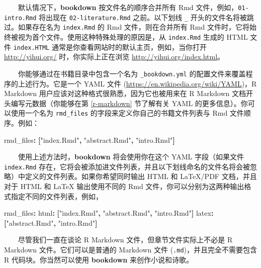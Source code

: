 \documentclass[
  12pt,
]{krantz}
\newenvironment{Shaded}{\begin{snugshade}}{\end{snugshade}}
\newcommand{\AttributeTok}[1]{\textcolor[rgb]{0.77,0.63,0.00}{#1}}
\newcommand{\FunctionTok}[1]{\textcolor[rgb]{0.00,0.00,0.00}{#1}}
\newcommand{\KeywordTok}[1]{\textcolor[rgb]{0.13,0.29,0.53}{\textbf{#1}}}
\newcommand{\StringTok}[1]{\textcolor[rgb]{0.31,0.60,0.02}{#1}}
\theoremstyle{definition}
\theoremstyle{definition}
\theoremstyle{definition}
\theoremstyle{definition}
\theoremstyle{remark}
\begin{document}
  默认情况下，\textbf{bookdown} 按文件名的顺序合并所有 Rmd 文件，例如，\texttt{01-intro.Rmd} 将出现在 \texttt{02-literature.Rmd} 之前。以下划线 \texttt{\_} 开头的文件名将被跳过。如果存在名为 \texttt{index.Rmd} 的 Rmd 文件，则在合并所有 Rmd 文件时，它将始终被视为首个文件。使用这种特殊处理的原因是，从 \texttt{index.Rmd} 生成的 HTML 文件 \texttt{index.HTML} 通常是你查看网站时的默认主页，例如，当你打开 \url{http://yihui.org/} 时，你实际上正在浏览 \url{http://yihui.org/index.html}。

  你能够通过在书籍目录中包含一个名为 \texttt{\_bookdown.yml} 的配置文件来覆盖程序的上述行为。它是一个 YAML 文件 (\url{https://en.wikipedia.org/wiki/YAML})，R Markdown 用户应该对这种格式很熟悉，因为它也被用来在 R Markdown 文档开头编写元数据（你能够在第 \ref{r-markdown} 节了解有关 YAML 的更多信息）。你可以使用一个名为 \texttt{rmd\_files} 的字段来定义你自己的书籍文件列表与 Rmd 文件顺序。例如：

\begin{Shaded}
\begin{Highlighting}[]
\FunctionTok{rmd\_files}\KeywordTok{:}\AttributeTok{ }\KeywordTok{[}\StringTok{"index.Rmd"}\KeywordTok{,}\AttributeTok{ }\StringTok{"abstract.Rmd"}\KeywordTok{,}\AttributeTok{ }\StringTok{"intro.Rmd"}\KeywordTok{]}
\end{Highlighting}
\end{Shaded}

  使用上述方法时，\textbf{bookdown} 将会使用你在这个 YAML 字段（如果文件 \texttt{index.Rmd} 存在，它将会被添加进文件列表，并且以下划线命名的文件名将会被忽略）中定义的文件列表。如果你希望同时输出 HTML 和 LaTeX/PDF 文档，并且对于 HTML 和 LaTeX 输出使用不同的 Rmd 文件，你可以分别为这两种输出格式指定不同的文件列表，例如，

\begin{Shaded}
\begin{Highlighting}[]
\FunctionTok{rmd\_files}\KeywordTok{:}
\AttributeTok{  }\FunctionTok{html}\KeywordTok{:}\AttributeTok{ }\KeywordTok{[}\StringTok{"index.Rmd"}\KeywordTok{,}\AttributeTok{ }\StringTok{"abstract.Rmd"}\KeywordTok{,}\AttributeTok{ }\StringTok{"intro.Rmd"}\KeywordTok{]}
\AttributeTok{  }\FunctionTok{latex}\KeywordTok{:}\AttributeTok{ }\KeywordTok{[}\StringTok{"abstract.Rmd"}\KeywordTok{,}\AttributeTok{ }\StringTok{"intro.Rmd"}\KeywordTok{]}
\end{Highlighting}
\end{Shaded}

  尽管我们一直在谈论 R Markdown 文件，但章节文件实际上不必是 R Markdown 文件。它们可以是普通的 Markdown 文件 (\texttt{.md})，并且完全不需要包含 R 代码块。你当然可以使用 \textbf{bookdown} 来创作小说和诗歌。
\end{document}
